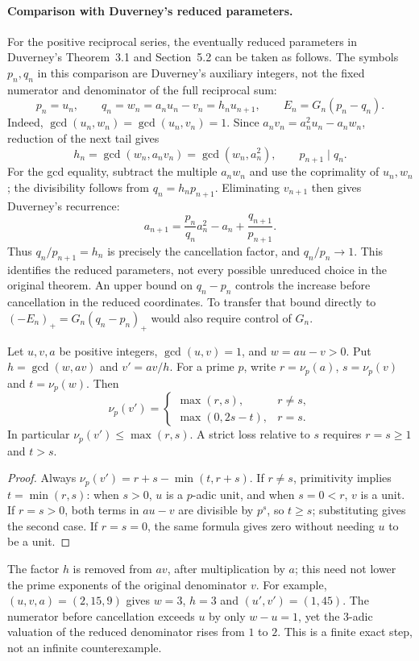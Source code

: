 \documentclass[11pt]{article}
\begin{document}
\paragraph{Comparison with Duverney's reduced parameters.}
For the positive reciprocal series, the eventually reduced parameters in Duverney's
Theorem~3.1 and Section~5.2 \cite[pp.~285--286, 299--300]{duverney2001}
can be taken as follows. The symbols $p_n,q_n$ in this comparison are
Duverney's auxiliary integers, not the fixed numerator and denominator
of the full reciprocal sum:
\[
 p_n=u_n,\qquad q_n=w_n=a_nu_n-v_n=h_nu_{n+1},\qquad
 E_n=G_n(p_n-q_n).
\]
Indeed, $\gcd(u_n,w_n)=\gcd(u_n,v_n)=1$. Since
$a_nv_n=a_n^2u_n-a_nw_n$, reduction of the next tail gives
\[
 h_n=\gcd(w_n,a_nv_n)=\gcd(w_n,a_n^2),\qquad
 p_{n+1}\mid q_n.
\]
For the gcd equality, subtract the multiple $a_nw_n$ and use the
coprimality of $u_n,w_n$; the divisibility follows from
$q_n=h_np_{n+1}$. Eliminating $v_{n+1}$ then gives Duverney's recurrence:
\[
 a_{n+1}=\frac{p_n}{q_n}a_n^2-a_n+\frac{q_{n+1}}{p_{n+1}}.
\]
Thus $q_n/p_{n+1}=h_n$ is precisely the cancellation factor, and
$q_n/p_n\to1$. This identifies the reduced parameters, not every possible
unreduced choice in the original theorem. An upper bound on $q_n-p_n$ controls the increase before cancellation
in the reduced coordinates. To transfer that bound directly to
$(-E_n)_+=G_n(q_n-p_n)_+$ would also require control of $G_n$.

\begin{lemma}\label{long243:res:valuationtransition}
Let $u,v,a$ be positive integers, $\gcd(u,v)=1$, and $w=au-v>0$.
Put $h=\gcd(w,av)$ and $v'=av/h$. For a prime $p$, write
$r=\nu_p(a)$, $s=\nu_p(v)$ and $t=\nu_p(w)$. Then
\[
 \nu_p(v')=
 \begin{cases}
 \max(r,s),&r\ne s,\\
 \max(0,2s-t),&r=s.
 \end{cases}
\]
In particular $\nu_p(v')\le\max(r,s)$. A strict loss relative to $s$
requires $r=s\ge1$ and $t>s$.
\end{lemma}
\begin{proof}
Always $\nu_p(v')=r+s-\min(t,r+s)$. If $r\ne s$, primitivity implies
$t=\min(r,s)$: when $s>0$, $u$ is a $p$-adic unit, and when $s=0<r$,
$v$ is a unit. If $r=s>0$, both terms in $au-v$ are divisible by $p^s$,
so $t\ge s$; substituting gives the second case. If $r=s=0$, the same
formula gives zero without needing $u$ to be a unit.
\end{proof}
The factor $h$ is removed from $av$, after multiplication by $a$; this
need not lower the prime exponents of the original denominator $v$.
For example, $(u,v,a)=(2,15,9)$ gives $w=3$, $h=3$ and
$(u',v')=(1,45)$. The numerator before cancellation exceeds $u$ by only
$w-u=1$, yet the $3$-adic valuation of the reduced denominator rises
from $1$ to $2$.
This is a finite exact step, not an infinite counterexample.
\end{document}
